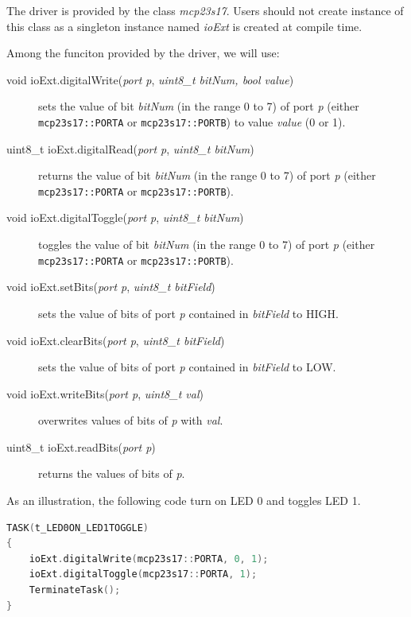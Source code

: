 \documentclass[11pt]{report}
\begin{document}
The driver is provided by the class \textit{mcp23s17}.
Users should not create instance of this class as a singleton instance named \textit{ioExt} is created at compile time.

Among the funciton provided by the driver, we will use:

\begin{description}
    \item[void ioExt.digitalWrite(\textit{port p}, \textit{uint8\_t bitNum, bool value})] sets the value of bit \textit{bitNum} (in the range 0 to 7) of port \textit{p} (either \texttt{mcp23s17::PORTA} or \texttt{mcp23s17::PORTB}) to value \textit{value} (0 or 1).

    \item[uint8\_t ioExt.digitalRead(\textit{port p}, \textit{uint8\_t bitNum})] returns the value of bit \textit{bitNum} (in the range 0 to 7) of port \textit{p} (either \texttt{mcp23s17::PORTA} or \texttt{mcp23s17::PORTB}).

    \item[void ioExt.digitalToggle(\textit{port p}, \textit{uint8\_t bitNum})] toggles the value of bit \textit{bitNum} (in the range 0 to 7) of port \textit{p} (either \texttt{mcp23s17::PORTA} or \texttt{mcp23s17::PORTB}).

    \item[void ioExt.setBits(\textit{port p}, \textit{uint8\_t bitField})] sets the value of bits of port \textit{p} contained in \textit{bitField} to HIGH.

    \item[void ioExt.clearBits(\textit{port p}, \textit{uint8\_t bitField})] sets the value of bits of port \textit{p} contained in \textit{bitField} to LOW.

    \item[void ioExt.writeBits(\textit{port p}, \textit{uint8\_t val})] overwrites values of bits of \textit{p} with \textit{val}.

    \item[uint8_t ioExt.readBits(\textit{port p})] returns the values of bits of \textit{p}.
\end{description}

As an illustration, the following code turn on LED 0 and toggles LED 1.

\begin{lstlisting}[language=C]
TASK(t_LED0ON_LED1TOGGLE)
{
    ioExt.digitalWrite(mcp23s17::PORTA, 0, 1);
    ioExt.digitalToggle(mcp23s17::PORTA, 1);
    TerminateTask();
}
\end{lstlisting}
\end{document}

